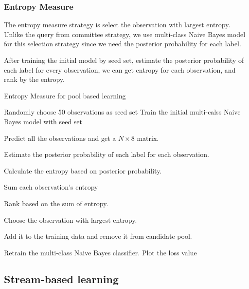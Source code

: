 \documentclass{article}
\begin{document}
\subsubsection{Entropy Measure}
The entropy measure\cite{joshi2009multi} strategy is select the observation with largest entropy. Unlike the query from committee strategy, we use multi-class Naive Bayes model for this selection strategy since we need the posterior probability for each label.

After training the initial model by seed set, estimate the posterior probability of each label for every observation, we can get entropy for each observation, and rank by the entropy.

\begin{algorithm}[H]
	\caption{Entropy Measure for pool based learning}
	\begin{algorithmic}
		\State Randomly choose 50 observations as seed set
		\State Train the initial multi-calss Naive Bayes model with seed set
		
			Predict all the observations and get a $N \times 8$ matrix.

			Estimate the posterior probability of each label for each observation.
	
			Calculate the entropy based on posterior probability.
			
			Sum each observation's entropy
			
			Rank based on the sum of entropy.
			
			Choose the observation with largest entropy.
			
			Add it to the training data and remove it from candidate pool.
			
			Retrain the multi-class Naive Bayes classifier.
		\EndWhile
	\State Plot the loss value
	\end{algorithmic}
\end{algorithm}

\subsection{Stream-based learning}
\end{document}
